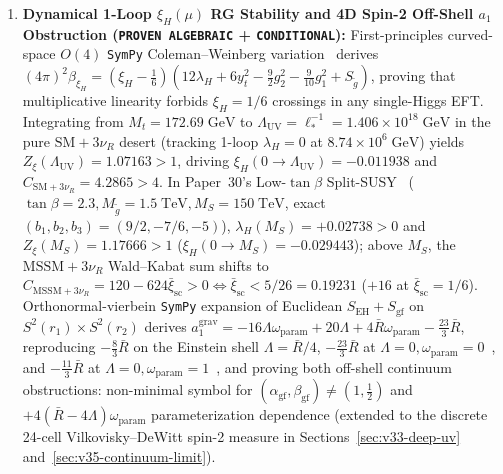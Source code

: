 \documentclass[11pt,a4paper]{article}
\begin{document}
\begin{enumerate}
\item \textbf{Dynamical 1-Loop $\xi_H(\mu)$ RG Stability and 4D Spin-2 Off-Shell $a_1$ Obstruction (\texttt{PROVEN ALGEBRAIC} + \texttt{CONDITIONAL}):} First-principles curved-space $O(4)$ \texttt{SymPy} Coleman--Weinberg variation~\cite{ParkerToms2009} derives $(4\pi)^2\beta_{\xi_H} = (\xi_H - \frac{1}{6})(12\lambda_H + 6y_t^2 - \frac{9}{2}g_2^2 - \frac{9}{10}g_1^2 + S_{\tilde g})$, proving that multiplicative linearity forbids $\xi_H = 1/6$ crossings in any single-Higgs EFT. Integrating from $M_t=172.69\;\mathrm{GeV}$ to $\Lambda_{\mathrm{UV}}=\ell_*^{-1}=1.406\times 10^{18}\;\mathrm{GeV}$ in the pure $\mathrm{SM}+3\nu_R$ desert (tracking 1-loop $\lambda_H=0$ at $8.74\times 10^6\;\mathrm{GeV}$) yields $Z_\xi(\Lambda_{\mathrm{UV}})=1.07163>1$, driving $\xi_H(0\to\Lambda_{\mathrm{UV}})=-0.011938$ and $C_{\mathrm{SM}+3\nu_R}=4.2865>4$. In Paper~30's Low-$\tan\beta$ Split-SUSY~\cite{GiudiceRomanino2004} ($\tan\beta=2.3, M_{\tilde g}=1.5\;\mathrm{TeV}, M_S=150\;\mathrm{TeV}$, exact $(b_1,b_2,b_3)=(9/2,-7/6,-5)$), $\lambda_H(M_S)=+0.02738>0$ and $Z_\xi(M_S)=1.17666>1$ ($\xi_H(0\to M_S)=-0.029443$); above $M_S$, the $\mathrm{MSSM}+3\nu_R$ Wald--Kabat sum shifts to $C_{\mathrm{MSSM}+3\nu_R}=120-624\bar\xi_{\mathrm{sc}}>0\iff\bar\xi_{\mathrm{sc}}<5/26=0.19231$ ($+16$ at $\bar\xi_{\mathrm{sc}}=1/6$). Orthonormal-vierbein \texttt{SymPy} expansion of Euclidean $S_{\mathrm{EH}}+S_{\mathrm{gf}}$ on $S^2(r_1)\times S^2(r_2)$ derives $a_1^{\mathrm{grav}} = -16\Lambda\omega_{\mathrm{param}} + 20\Lambda + 4\bar R\omega_{\mathrm{param}} - \frac{23}{3}\bar R$, reproducing $-\frac{8}{3}\bar R$ on the Einstein shell $\Lambda=\bar R/4$, $-\frac{23}{3}\bar R$ at $\Lambda=0, \omega_{\mathrm{param}}=0$~\cite{FursaevSolodukhin1995}, and $-\frac{11}{3}\bar R$ at $\Lambda=0, \omega_{\mathrm{param}}=1$~\cite{Falls2015}, and proving both off-shell continuum obstructions: non-minimal symbol for $(\alpha_{\mathrm{gf}},\beta_{\mathrm{gf}})\neq(1,\frac{1}{2})$ and $+4(\bar R-4\Lambda)\omega_{\mathrm{param}}$ parameterization dependence (extended to the discrete 24-cell Vilkovisky--DeWitt spin-2 measure in Sections~\ref{sec:v33-deep-uv} and~\ref{sec:v35-continuum-limit}).

\end{enumerate}
\end{document}
